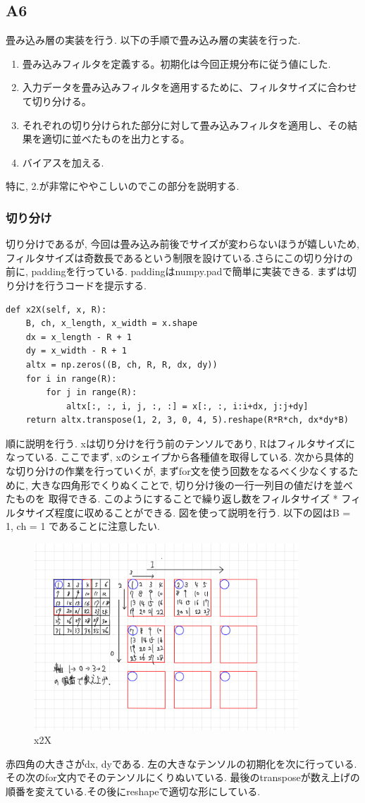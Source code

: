 \documentclass[a4paper,11pt]{jsarticle}
\begin{document}
\subsection{A6}
畳み込み層の実装を行う.
以下の手順で畳み込み層の実装を行った.
\begin{enumerate}
  \item 畳み込みフィルタを定義する。初期化は今回正規分布に従う値にした.
  \item 入力データを畳み込みフィルタを適用するために、フィルタサイズに合わせて切り分ける。
  \item それぞれの切り分けられた部分に対して畳み込みフィルタを適用し、その結果を適切に並べたものを出力とする。
  \item バイアスを加える.
\end{enumerate}
特に, 2.が非常にややこしいのでこの部分を説明する.
\subsubsection*{切り分け}
切り分けであるが, 今回は畳み込み前後でサイズが変わらないほうが嬉しいため,
フィルタサイズは奇数長であるという制限を設けている.さらにこの切り分けの前に, paddingを行っている.
paddingはnumpy.padで簡単に実装できる.
まずは切り分けを行うコードを提示する.
\begin{lstlisting}[caption=x2X]
  def x2X(self, x, R):
    B, ch, x_length, x_width = x.shape
    dx = x_length - R + 1
    dy = x_width - R + 1
    altx = np.zeros((B, ch, R, R, dx, dy))
    for i in range(R):
        for j in range(R):
            altx[:, :, i, j, :, :] = x[:, :, i:i+dx, j:j+dy]
    return altx.transpose(1, 2, 3, 0, 4, 5).reshape(R*R*ch, dx*dy*B)
\end{lstlisting}

順に説明を行う. xは切り分けを行う前のテンソルであり, Rはフィルタサイズになっている.
ここでまず, xのシェイプから各種値を取得している. 次から具体的な切り分けの作業を行っていくが,
まずfor文を使う回数をなるべく少なくするために, 大きな四角形でくりぬくことで, 切り分け後の一行一列目の値だけを並べたものを
取得できる. このようにすることで繰り返し数をフィルタサイズ * フィルタサイズ程度に収めることができる.
図を使って説明を行う. 以下の図はB = 1, ch = 1 であることに注意したい.
\begin{figure}[H]
  \centering
  \includegraphics[height = 7cm]{rep_conv.jpg}
  \caption{x2X}
\end{figure}
赤四角の大きさがdx, dyである. 左の大きなテンソルの初期化を次に行っている.
その次のfor文内でそのテンソルにくりぬいている.
最後のtransposeが数え上げの順番を変えている.その後にreshapeで適切な形にしている.
\end{document}
